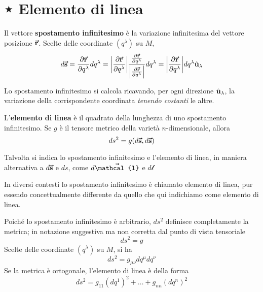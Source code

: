\section{⋆ Elemento di linea}
\begin{define}
	Il vettore \textbf{spostamento infinitesimo} è la variazione infinitesima del vettore posizione $\vb*{\va{r}}$. Scelte delle coordinate $(q^\lambda)$ su $M$,%
	\begin{equation}
		d\vb*{\va{s}}=\pdv{\vb*{\va{r}}}{q^\lambda}dq^\lambda=\abs{\pdv{\vb*{\va{r}}}{q^\lambda}}\frac{\pdv{\vb*{\va{r}}}{q^\lambda}}{\abs{\pdv{\vb*{\va{r}}}{q^\lambda}}}dq^\lambda=\abs{\pdv{\vb*{\va{r}}}{q^\lambda}}dq^\lambda\hat{\mathbf{u}}_\lambda
	\end{equation}
\end{define}
Lo spostamento infinitesimo si calcola ricavando, per ogni direzione $\hat{\mathbf{u}}_\lambda$, la variazione della corrispondente coordinata \textit{tenendo costanti} le altre.
\begin{define}
	L'\textbf{elemento di linea} è il quadrato della lunghezza di uno spostamento infinitesimo. Se $g$ è il tensore metrico della varietà $n$-dimensionale, allora
	\begin{equation}
		ds^2=g(d\vb*{\va{s}},d\vb*{\va{s}})
	\end{equation}
\end{define}
\begin{notate}
	Talvolta si indica lo spostamento infinitesimo e l'elemento di linea, in maniera alternativa a $d\vb*{\va{s}}$ e $ds$, come $d\vba{\mathcal{l}}$ e $d\mathcal{l}$
\end{notate}
\begin{attention}
	In diversi contesti lo spostamento infinitesimo è chiamato elemento di linea, pur essendo concettualmente differente da quello che qui indichiamo come elemento di linea.
\end{attention}
Poiché lo spostamento infinitesimo è arbitrario, $ds^2$ definisce completamente la metrica; in notazione suggestiva ma non corretta dal punto di vista tensoriale
\begin{equation}
	ds^2=g
\end{equation}
Scelte delle coordinate $(q^\lambda)$ su $M$, si ha
\begin{equation}
	ds^2=g_{\mu\nu}dq^{\mu}dq^{\nu}
\end{equation}
Se la metrica è ortogonale, l'elemento di linea è della forma
\begin{equation}
	ds^2=g_{11}\left(dq^1\right)^2+\ldots+g_{nn}\left(dq^n\right)^2
\end{equation}
